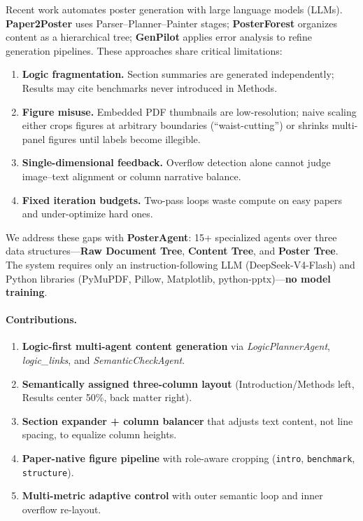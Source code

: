 \documentclass{article}
\begin{document}
Recent work automates poster generation with large language models (LLMs). \textbf{Paper2Poster} uses Parser--Planner--Painter stages; \textbf{PosterForest} organizes content as a hierarchical tree; \textbf{GenPilot} applies error analysis to refine generation pipelines. These approaches share critical limitations:
\begin{enumerate}[leftmargin=*]
  \item \textbf{Logic fragmentation.} Section summaries are generated independently; Results may cite benchmarks never introduced in Methods.
  \item \textbf{Figure misuse.} Embedded PDF thumbnails are low-resolution; naive scaling either crops figures at arbitrary boundaries (``waist-cutting'') or shrinks multi-panel figures until labels become illegible.
  \item \textbf{Single-dimensional feedback.} Overflow detection alone cannot judge image--text alignment or column narrative balance.
  \item \textbf{Fixed iteration budgets.} Two-pass loops waste compute on easy papers and under-optimize hard ones.
\end{enumerate}

We address these gaps with \textbf{PosterAgent}: 15+ specialized agents over three data structures---\textbf{Raw Document Tree}, \textbf{Content Tree}, and \textbf{Poster Tree}. The system requires only an instruction-following LLM (DeepSeek-V4-Flash) and Python libraries (PyMuPDF, Pillow, Matplotlib, python-pptx)---\textbf{no model training}.

\paragraph{Contributions.}
\begin{enumerate}[label=\textbf{C\arabic*.}, leftmargin=*]
  \item \textbf{Logic-first multi-agent content generation} via \emph{LogicPlannerAgent}, \emph{logic\_links}, and \emph{SemanticCheckAgent}.
  \item \textbf{Semantically assigned three-column layout} (Introduction/Methods left, Results center 50\%, back matter right).
  \item \textbf{Section expander + column balancer} that adjusts text content, not line spacing, to equalize column heights.
  \item \textbf{Paper-native figure pipeline} with role-aware cropping (\texttt{intro}, \texttt{benchmark}, \texttt{structure}).
  \item \textbf{Multi-metric adaptive control} with outer semantic loop and inner overflow re-layout.
\end{enumerate}
\end{document}
